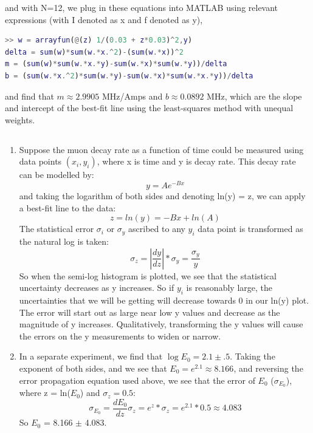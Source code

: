 \documentclass{article}
\begin{document}
\begin{enumerate}
\begin{equation}
    \end{equation}
    and with N=12, we plug in these equations into MATLAB using relevant expressions (with I denoted as x and f denoted as y), 
    \begin{lstlisting}[language=Matlab, caption=Matlab code]
>> w = arrayfun(@(z) 1/(0.03 + z*0.03)^2,y)
delta = sum(w)*sum(w.*x.^2)-(sum(w.*x))^2
m = (sum(w)*sum(w.*x.*y)-sum(w.*x)*sum(w.*y))/delta
b = (sum(w.*x.^2)*sum(w.*y)-sum(w.*x)*sum(w.*x.*y))/delta
    \end{lstlisting}
    and find that $m\approx 2.9905$ MHz/Amps and $b\approx 0.0892$ MHz, which are the slope and intercept of the best-fit line using the least-squares method with unequal weights.
    \end{enumerate}
    \subsection{}
    \begin{enumerate}
        \item Suppose the muon decay rate as a function of time could be measured using data points $(x_i,y_i)$, where x is time and y is decay rate. This decay rate can be modelled by:
        \begin{equation}
            y = Ae^{-Bx}
        \end{equation}
        and taking the logarithm of both sides and denoting ln(y) = z, we can apply a best-fit line to the data:
        \begin{equation}
            z = ln(y) = -Bx + ln(A) 
        \end{equation}
        The statistical error $\sigma_i$ or $\sigma_y$ ascribed to any $y_i$ data point is transformed as the natural log is taken:
        \begin{equation}
            \sigma_z = |\frac{dy}{dz}|*\sigma_y = \frac{\sigma_y}{y}
        \end{equation}
        So when the semi-log histogram is plotted, we see that the statistical uncertainty decreases as y increases. So if $y_i$ is reasonably large, the uncertainties that we will be getting will decrease towards 0 in our ln(y) plot. The error will start out as large near low y values and decrease as the magnitude of y increases. Qualitatively, transforming the y values will cause the errors on the y measurements to widen or narrow.
        \item In a separate experiment, we find that $\log E_0 = 2.1 \pm .5$. Taking the exponent of both sides, and we see that $E_0 = e^{2.1} \approx 8.166$, and reversing the error propagation equation used above, we see that the error of $E_0$ ($\sigma_{E_0}$), where z = ln($E_0$) and $\sigma_z = 0.5$:
        \begin{equation}
            \sigma_{E_0} = \frac{dE_0}{dz}\sigma_z = e^z*\sigma_z = e^{2.1}*0.5 \approx 4.083
        \end{equation}
        So $E_0$ = 8.166 $\pm$ 4.083.
    \end{enumerate}
\end{document}
